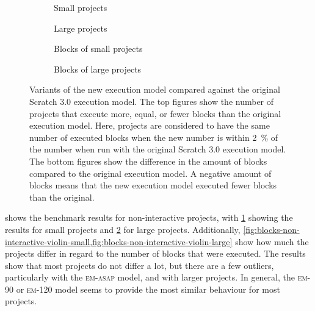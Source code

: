 \documentclass[../main]{subfiles}
\begin{document}
\begin{figure}
    \begin{wide}
        \begin{subfigure}{\linewidth}
            \centering
            
        \end{subfigure}
        \begin{subfigure}{0.49\linewidth}
            
            \caption{Small projects}
            \label{fig:blocks-non-interactive-small}
        \end{subfigure}
        \begin{subfigure}{0.49\linewidth}
            
            \caption{Large projects}
            \label{fig:blocks-non-interactive-large}
        \end{subfigure}
        \par\bigskip
        \begin{subfigure}{0.49\linewidth}
            
            \caption{Blocks of small projects}
            \label{fig:blocks-non-interactive-violin-small}
        \end{subfigure}
        \begin{subfigure}{0.49\linewidth}
            
            \caption{Blocks of large projects}
            \label{fig:blocks-non-interactive-violin-large}
        \end{subfigure}
    \end{wide}
    \caption{
        Variants of the new execution model compared against the original Scratch 3.0 execution model.
        The top figures show the number of projects that execute more, equal, or fewer blocks than the original execution model.
        Here, projects are considered to have the same number of executed blocks when the new number is within \qty{2}{\percent} of the number when run with the original Scratch 3.0 execution model.
        The bottom figures show the difference in the amount of blocks compared to the original execution model.
        A negative amount of blocks means that the new execution model executed fewer blocks than the original.
    }
    \label{fig:blocks-non-interactive}
\end{figure}


 shows the benchmark results for non-interactive projects, with \cref{fig:blocks-non-interactive-small} showing the results for small projects and \cref{fig:blocks-non-interactive-large} for large projects.
Additionally, \cref{fig:blocks-non-interactive-violin-small,fig:blocks-non-interactive-violin-large} show how much the projects differ in regard to the number of blocks that were executed.
The results show that most projects do not differ a lot, but there are a few outliers, particularly with the \textsc{em-asap} model, and with larger projects.
In general, the \textsc{em-90} or \textsc{em-120} model seems to provide the most similar behaviour for most projects.
\end{document}
